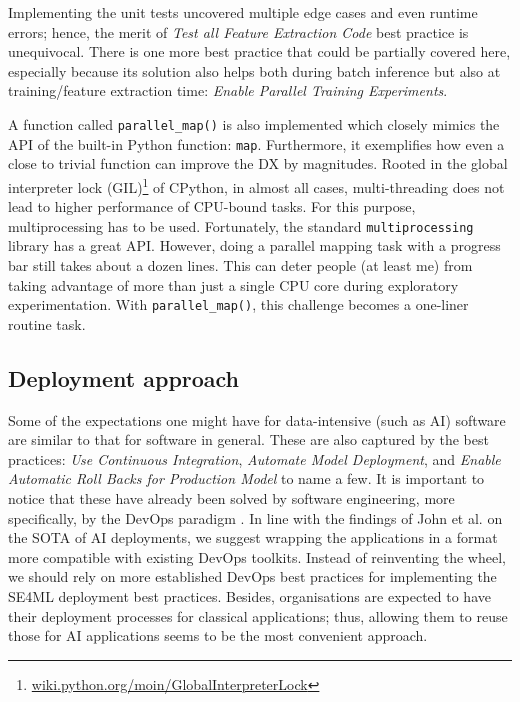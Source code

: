 Implementing the unit tests uncovered multiple edge cases and even runtime errors; hence, the merit of \textit{Test all Feature Extraction Code} best practice is unequivocal. There is one more best practice that could be partially covered here, especially because its solution also helps both during batch inference but also at training/feature extraction time: \textit{Enable Parallel Training Experiments}.

A function called \texttt{parallel\_map()} is also implemented which closely mimics the API of the built-in Python function: \texttt{map}. Furthermore, it exemplifies how even a close to trivial function can improve the DX by magnitudes. Rooted in the global interpreter lock (GIL)\footnote{\href{https://wiki.python.org/moin/GlobalInterpreterLock}{wiki.python.org/moin/GlobalInterpreterLock}} of CPython, in almost all cases, multi-threading does not lead to higher performance of CPU-bound tasks. For this purpose, multiprocessing has to be used. Fortunately, the standard \texttt{multiprocessing} library has a great API. However, doing a parallel mapping task with a progress bar still takes about a dozen lines. This can deter people (at least me) from taking advantage of more than just a single CPU core during exploratory experimentation. With \texttt{parallel\_map()}, this challenge becomes a one-liner routine task. 

\subsection{Deployment approach}

Some of the expectations one might have for data-intensive (such as AI) software are similar to that for software in general. These are also captured by the best practices: \textit{Use Continuous Integration}, \textit{Automate Model Deployment}, and \textit{Enable Automatic Roll Backs for Production Model} to name a few. It is important to notice that these have already been solved by software engineering, more specifically, by the DevOps paradigm \cite{leite2019survey}. 
In line with the findings of John et al. \cite{john2020architecting} on the SOTA of AI deployments, we suggest wrapping the applications in a format more compatible with existing DevOps toolkits. Instead of reinventing the wheel, we should rely on more established DevOps best practices for implementing the SE4ML deployment best practices. Besides, organisations are expected to have their deployment processes for classical applications; thus, allowing them to reuse those for AI applications seems to be the most convenient approach.

